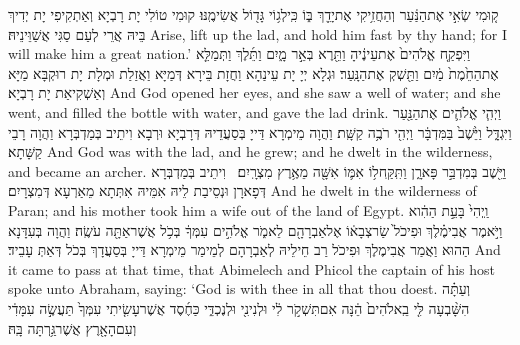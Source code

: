 {ק֚וּמִי שְׂאִ֣י אֶת\maqqaf הַנַּ֔עַר וְהַחֲזִ֥יקִי אֶת\maqqaf יָדֵ֖ךְ בּ֑וֹ כִּֽי\maqqaf לְג֥וֹי גָּד֖וֹל אֲשִׂימֶֽנּוּ׃}
{קוּמִי טוֹלִי יָת רָבְיָא וְאַתְקִיפִי יָת יְדִיךְ בֵּיהּ אֲרֵי לְעַם סַגִּי אֲשַׁוֵּינֵיהּ׃}
{Arise, lift up the lad, and hold him fast by thy hand; for I will make him a great nation.’}{}
{וַיִּפְקַ֤ח אֱלֹהִים֙ אֶת\maqqaf עֵינֶ֔יהָ וַתֵּ֖רֶא בְּאֵ֣ר מָ֑יִם וַתֵּ֜לֶךְ וַתְּמַלֵּ֤א אֶת\maqqaf הַחֵ֙מֶת֙ מַ֔יִם וַתַּ֖שְׁקְ אֶת\maqqaf הַנָּֽעַר׃}
{וּגְלָא יְיָ יָת עֵינַהָא וַחֲזָת בֵּירָא דְּמַיָּא וַאֲזַלַת וּמְלָת יָת רוּקְבָּא מַיָּא וְאַשְׁקִיאַת יָת רָבְיָא׃}
{And God opened her eyes, and she saw a well of water; and she went, and filled the bottle with water, and gave the lad drink.}{}
{וַיְהִ֧י אֱלֹהִ֛ים אֶת\maqqaf הַנַּ֖עַר וַיִּגְדָּ֑ל וַיֵּ֙שֶׁב֙ בַּמִּדְבָּ֔ר וַיְהִ֖י רֹבֶ֥ה קַשָּֽׁת׃}
{וַהֲוָה מֵימְרָא דַּייָ בְּסַעֲדֵיהּ דְּרָבְיָא וּרְבָא וִיתֵיב בְּמַדְבְּרָא וַהֲוָה רָבֵי קַשָּׁתָא׃}
{And God was with the lad, and he grew; and he dwelt in the wilderness, and became an archer.}{}
{וַיֵּ֖שֶׁב בְּמִדְבַּ֣ר פָּארָ֑ן וַתִּֽקַּֽח\maqqaf ל֥וֹ אִמּ֛וֹ אִשָּׁ֖ה מֵאֶ֥רֶץ מִצְרָֽיִם׃ \petucha }
{וִיתֵיב בְּמַדְבְּרָא דְּפָארָן וּנְסֵיבַת לֵיהּ אִמֵּיהּ אִתְּתָא מֵאַרְעָא דְּמִצְרָיִם׃}
{And he dwelt in the wilderness of Paran; and his mother took him a wife out of the land of Egypt.}{}
{וַֽיְהִי֙ בָּעֵ֣ת הַהִ֔וא וַיֹּ֣אמֶר אֲבִימֶ֗לֶךְ וּפִיכֹל֙ שַׂר\maqqaf צְבָא֔וֹ אֶל\maqqaf אַבְרָהָ֖ם לֵאמֹ֑ר אֱלֹהִ֣ים עִמְּךָ֔ בְּכֹ֥ל אֲשֶׁר\maqqaf אַתָּ֖ה עֹשֶֽׂה׃}
{וַהֲוָה בְּעִדָּנָא הַהוּא וַאֲמַר אֲבִימֶלֶךְ וּפִיכׂל רַב חֵילֵיהּ לְאַבְרָהָם לְמֵימַר מֵימְרָא דַּייָ בְּסַעֲדָךְ בְּכֹל דְּאַתְּ עָבֵיד׃}
{And it came to pass at that time, that Abimelech and Phicol the captain of his host spoke unto Abraham, saying: ‘God is with thee in all that thou doest.}{}
{וְעַתָּ֗ה הִשָּׁ֨בְעָה לִּ֤י בֵֽאלֹהִים֙ הֵ֔נָּה אִם\maqqaf תִּשְׁקֹ֣ר לִ֔י וּלְנִינִ֖י וּלְנֶכְדִּ֑י כַּחֶ֜סֶד אֲשֶׁר\maqqaf עָשִׂ֤יתִי עִמְּךָ֙ תַּעֲשֶׂ֣ה עִמָּדִ֔י וְעִם\maqqaf הָאָ֖רֶץ אֲשֶׁר\maqqaf גַּ֥רְתָּה בָּֽהּ׃}
